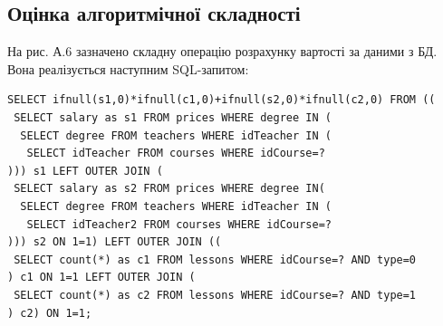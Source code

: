 \subsection{Оцінка алгоритмічної складності}
\bigbreak
На рис. А.6 зазначено складну операцію розрахунку вартості за даними з БД. Вона реалізується наступним SQL-запитом:

{ \fontsize{11pt}{12pt} \selectfont
\begin{verbatim}
SELECT ifnull(s1,0)*ifnull(c1,0)+ifnull(s2,0)*ifnull(c2,0) FROM ((
 SELECT salary as s1 FROM prices WHERE degree IN (
  SELECT degree FROM teachers WHERE idTeacher IN (
   SELECT idTeacher FROM courses WHERE idCourse=?
))) s1 LEFT OUTER JOIN (
 SELECT salary as s2 FROM prices WHERE degree IN(
  SELECT degree FROM teachers WHERE idTeacher IN (
   SELECT idTeacher2 FROM courses WHERE idCourse=?
))) s2 ON 1=1) LEFT OUTER JOIN ((
 SELECT count(*) as c1 FROM lessons WHERE idCourse=? AND type=0
) c1 ON 1=1 LEFT OUTER JOIN (
 SELECT count(*) as c2 FROM lessons WHERE idCourse=? AND type=1
) c2) ON 1=1;
\end{verbatim}
}

